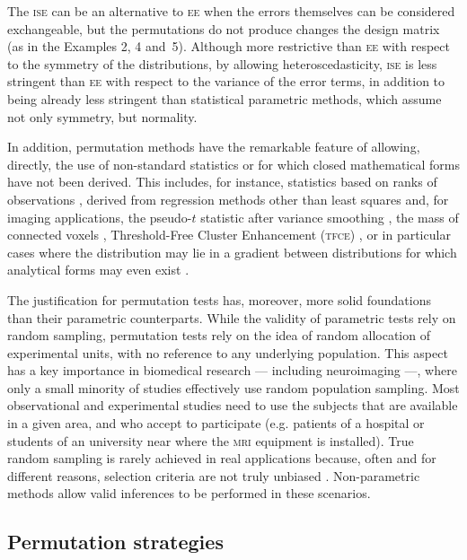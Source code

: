 The \textsc{ise} can be an alternative to \textsc{ee} when the errors themselves can be considered exchangeable, but the permutations do not produce changes the design matrix (as in the Examples 2, 4 and~5). Although more restrictive than \textsc{ee} with respect to the symmetry of the distributions, by allowing heteroscedasticity, \textsc{ise} is less stringent than \textsc{ee} with respect to the variance of the error terms, in addition to being already less stringent than statistical parametric methods, which assume not only symmetry, but normality.

In addition, permutation methods have the remarkable feature of allowing, directly, the use of non-standard statistics or for which closed mathematical forms have not been derived. This includes, for instance, statistics based on ranks of observations \citep{Brunner2000, Rorden2007}, derived from regression methods other than least squares \citep{Cade1996} and, for imaging applications, the pseudo-$t$ statistic after variance smoothing \citep{Holmes1996}, the mass of connected voxels \citep{Brammer1997}, Threshold-Free Cluster Enhancement (\textsc{tfce}) \citep{Smith2009}, or in particular cases where the distribution may lie in a gradient between distributions for which analytical forms may even exist \citep{Winkler2012}.

The justification for permutation tests has, moreover, more solid foundations than their parametric counterparts. While the validity of parametric tests rely on random sampling, permutation tests rely on the idea of random allocation of experimental units, with no reference to any underlying population. This aspect has a key importance in biomedical research --- including neuroimaging ---, where only a small minority of studies effectively use random population sampling. Most observational and experimental studies need to use the subjects that are available in a given area, and who accept to participate (e.g. patients of a hospital or students of an university near where the \textsc{mri} equipment is installed). True random sampling is rarely achieved in real applications because, often and for different reasons, selection criteria are not truly unbiased \citep{Ludbrook1998, Pesarin2010}. Non-parametric methods allow valid inferences to be performed in these scenarios.

\subsection{Permutation strategies}

